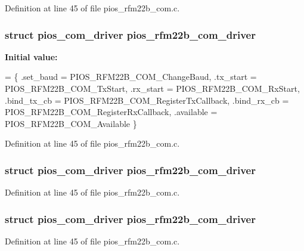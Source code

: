 Definition at line 45 of file pios\-\_\-rfm22b\-\_\-com.\-c.

\hypertarget{group___p_i_o_s___r_f_m22_b_gafc506e8bc70ed8b31b75cbddf28ee660}{
\subsubsection[{pios\-\_\-rfm22b\-\_\-com\-\_\-driver}]{\setlength{\rightskip}{0pt plus 5cm}struct {\bf pios\-\_\-com\-\_\-driver} pios\-\_\-rfm22b\-\_\-com\-\_\-driver}}\label{group___p_i_o_s___r_f_m22_b_gafc506e8bc70ed8b31b75cbddf28ee660}
{\bfseries Initial value\-:}
\begin{DoxyCode}
= \{
        .set\_baud   = PIOS\_RFM22B\_COM\_ChangeBaud,
        .tx\_start   = PIOS\_RFM22B\_COM\_TxStart,
        .rx\_start   = PIOS\_RFM22B\_COM\_RxStart,
        .bind\_tx\_cb = PIOS\_RFM22B\_COM\_RegisterTxCallback,
        .bind\_rx\_cb = PIOS\_RFM22B\_COM\_RegisterRxCallback,
        .available  = PIOS\_RFM22B\_COM\_Available
\}
\end{DoxyCode}


Definition at line 45 of file pios\-\_\-rfm22b\-\_\-com.\-c.

\hypertarget{group___p_i_o_s___r_f_m22_b_gafc506e8bc70ed8b31b75cbddf28ee660}{
\subsubsection[{pios\-\_\-rfm22b\-\_\-com\-\_\-driver}]{\setlength{\rightskip}{0pt plus 5cm}struct {\bf pios\-\_\-com\-\_\-driver} pios\-\_\-rfm22b\-\_\-com\-\_\-driver}}\label{group___p_i_o_s___r_f_m22_b_gafc506e8bc70ed8b31b75cbddf28ee660}


Definition at line 45 of file pios\-\_\-rfm22b\-\_\-com.\-c.

\hypertarget{group___p_i_o_s___r_f_m22_b_gafc506e8bc70ed8b31b75cbddf28ee660}{
\subsubsection[{pios\-\_\-rfm22b\-\_\-com\-\_\-driver}]{\setlength{\rightskip}{0pt plus 5cm}struct {\bf pios\-\_\-com\-\_\-driver} pios\-\_\-rfm22b\-\_\-com\-\_\-driver}}\label{group___p_i_o_s___r_f_m22_b_gafc506e8bc70ed8b31b75cbddf28ee660}


Definition at line 45 of file pios\-\_\-rfm22b\-\_\-com.\-c.

